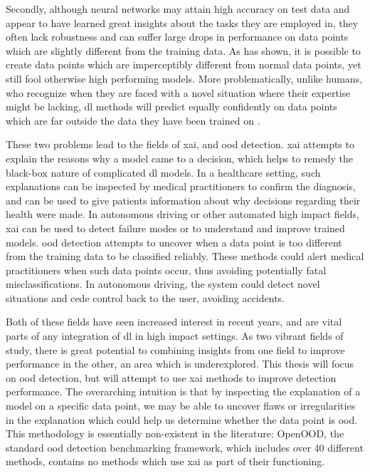 \documentclass[UKenglish]{uiomasterthesis} %
\theoremstyle{definition}
\begin{document}
Secondly, although neural networks may attain high accuracy on test data and appear to have learned great insights about the tasks they are employed in, they often lack robustness and can suffer large drops in performance on data points which are slightly different from the training data. As \cite{intriguing} has shown, it is possible to create data points which are imperceptibly different from normal data points, yet still fool otherwise high performing models. More problematically, unlike humans, who recognize when they are faced with a novel situation where their expertise might be lacking, \ac{dl} methods will predict equally confidently on data points which are far outside the data they have been trained on \cite{tingsim}.

These two problems lead to the fields of \ac{xai}, and \ac{ood} detection. \ac{xai} attempts to explain the reasons why a model came to a decision, which helps to remedy the black-box nature of complicated \ac{dl} models. In a healthcare setting, such explanations can be inspected by medical practitioners to confirm the diagnosis, and can be used to give patients information about why decisions regarding their health were made. In autonomous driving or other automated high impact fields, \ac{xai} can be used to detect failure modes or to understand and improve trained models. \ac{ood} detection attempts to uncover when a data point is too different from the training data to be classified reliably. These methods could alert medical practitioners when such data points occur, thus avoiding potentially fatal misclassifications. In autonomous driving, the system could detect novel situations and cede control back to the user, avoiding accidents.

Both of these fields have seen increased interest in recent years, and are vital parts of any integration of \ac{dl} in high impact settings. As two vibrant fields of study, there is great potential to combining insights from one field to improve performance in the other, an area which is underexplored. This thesis will focus on \ac{ood} detection, but will attempt to use \ac{xai} methods to improve detection performance. The overarching intuition is that by inspecting the explanation of a model on a specific data point, we may be able to uncover flaws or irregularities in the explanation which could help us determine whether the data point is \ac{ood}. This methodology is essentially non-existent in the literature: OpenOOD, the standard \ac{ood} detection benchmarking framework, which includes over 40 different methods, contains no methods which use \ac{xai} as part of their functioning.
\end{document}
